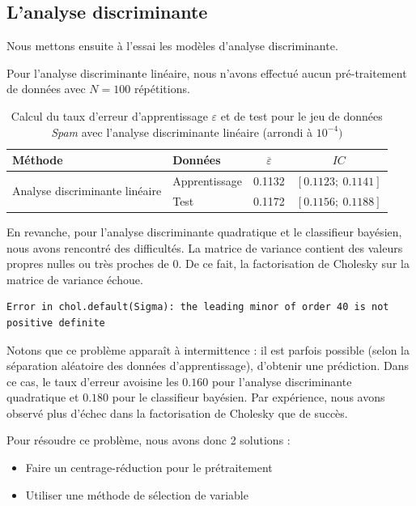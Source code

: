 \documentclass{article}
\begin{document}
\subsection{L'analyse discriminante}

Nous mettons ensuite à l'essai les modèles d'analyse discriminante.

Pour l'analyse discriminante linéaire, nous n'avons effectué aucun pré-traitement de données avec $N=100$ répétitions.
\begin{table}[H]
\centering
\caption{Calcul du taux d'erreur d'apprentissage $\varepsilon$ et de test pour le jeu de données \textit{Spam} avec l'analyse discriminante linéaire (arrondi à $10^{-4})$}
\begin{tabular}{l|l|cc}
\multicolumn{1}{l|}{\textbf{Méthode}}    & \textbf{Données} &$ \overline{\varepsilon}$ & $IC$                      \\ \hline
\multirow{2}{*}{Analyse discriminante linéaire}                  & Apprentissage    & 0.1132                             & $\left[0.1123 ;~ 0.1141 \right]$  \\
                                       & Test             & 0.1172                                 & $\left[0.1156 ;~ 0.1188 \right]$ \\ 
\end{tabular}

\label{spam_adl}
\end{table}

En revanche, pour l'analyse discriminante quadratique et le classifieur bayésien, nous avons rencontré des difficultés. La matrice de variance contient des valeurs propres nulles ou très proches de 0. De ce fait, la factorisation de Cholesky sur la matrice de variance échoue. 
\begin{lstlisting}
Error in chol.default(Sigma): the leading minor of order 40 is not positive definite
\end{lstlisting}

Notons que ce problème apparaît à intermittence : il est parfois possible (selon la séparation aléatoire des données d'apprentissage), d'obtenir une prédiction. Dans ce cas, le taux d'erreur avoisine les $0.160$ pour l'analyse discriminante quadratique et $0.180$ pour le classifieur bayésien. Par expérience, nous avons observé plus d'échec dans la factorisation de Cholesky que de succès.




Pour résoudre ce problème, nous avons donc 2 solutions :
\begin{itemize}
\item Faire un centrage-réduction pour le prétraitement
\item Utiliser une méthode de sélection de variable
\end{itemize}
\end{document}
